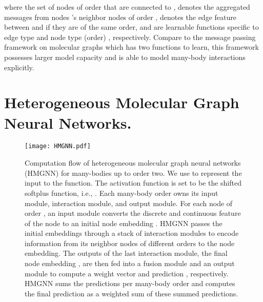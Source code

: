 \documentclass[conference]{IEEEtran}
\begin{document}
where  the set of nodes of order  that are connected to ,  denotes the aggregated messages from nodes 's neighbor nodes of order ,  denotes the edge feature between  and  if they are of the same order,  and  are learnable functions specific to edge type  and node type (order) , respectively. Compare to the message passing framework on molecular graphs which has two functions to learn, this framework possesses larger model capacity and is able to model many-body interactions explicitly.

\section{Heterogeneous Molecular Graph Neural Networks.}

\begin{figure*}[t]
\centering

\texttt{[image: HMGNN.pdf]}
\caption{Computation flow of heterogeneous molecular graph neural networks (HMGNN) for many-bodies up to order two. We use  to represent the input to the function. The activation function is set to be the shifted softplus function, i.e., . Each many-body order  owns its input module, interaction module, and output module. For each node  of order , an input module converts the discrete and continuous feature of the node to an initial node embedding . HMGNN passes the initial embeddings through a stack of  interaction modules to encode information from its neighbor nodes of different orders to the node embedding. The outputs of the last interaction module, the final node embedding , are then fed into a fusion module and an output module to compute a weight vector  and prediction , respectively. HMGNN sums the predictions per many-body order and computes the final prediction as a weighted sum of these summed predictions.}
\label{fig:HMGNN}
\end{figure*}
\end{document}
